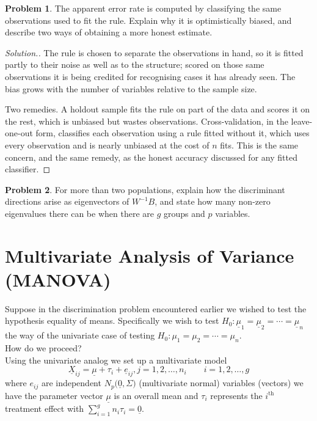 \documentclass[11pt,a4paper]{article}
\theoremstyle{definition}
\newtheorem{problemx}{Problem}[section]
\newenvironment{problem}{\begin{problemx}}{\end{problemx}}
\newenvironment{solution}
  {\renewcommand{\qedsymbol}{}\begin{proof}[\textit{Solution}.]}
  {\end{proof}}
\begin{document}
\begin{problem}
The apparent error rate is computed by classifying the same observations used to
fit the rule. Explain why it is optimistically biased, and describe two ways of
obtaining a more honest estimate.
\end{problem}

\begin{solution}
The rule is chosen to separate the observations in hand, so it is fitted partly
to their noise as well as to the structure; scored on those same observations it
is being credited for recognising cases it has already seen. The bias grows with
the number of variables relative to the sample size.

Two remedies. A holdout sample fits the rule on part of the data and scores it
on the rest, which is unbiased but wastes observations. Cross-validation, in the
leave-one-out form, classifies each observation using a rule fitted without it,
which uses every observation and is nearly unbiased at the cost of $n$ fits.
This is the same concern, and the same remedy, as the honest accuracy discussed
for any fitted classifier.
\end{solution}

\begin{problem}
For more than two populations, explain how the discriminant directions arise as
eigenvectors of $W^{-1}B$, and state how many non-zero eigenvalues there can be
when there are $g$ groups and $p$ variables.
\end{problem}

\section{Multivariate Analysis of Variance (MANOVA)}
Suppose in the discrimination problem encountered earlier we wished to test the hypothesis equality of means. Specifically we wish to test $H_0:\underline{\mu}_1 = \underline{\mu}_2 = \cdots= \underline{\mu}_n$ the way of the univariate case of testing $H_0: \mu_1 = \mu_2 = \cdots= \mu_n$.\\

How do we proceed?\\

Using the univariate analog we set up a multivariate model \begin{equation}\tag{1}
\underline{X}_{ij}= \underline{\mu} + \tau _i + \underline{e}_{ij},  j=1,2,\ldots,n_i\qquad i=1,2,\ldots,g
\end{equation}
where $e_{ij}$ are independent $N_p\big(\underline{0},\Sigma\big)$ (multivariate normal) variables (vectors) we have the parameter vector $\underline{\mu}$ is an overall mean and $\tau_i$ represents the $i^{\text{th}}$ treatment effect with $\sum\limits^g_{i=1}n_i\tau_i= \underline{0}$.\\
\end{document}
